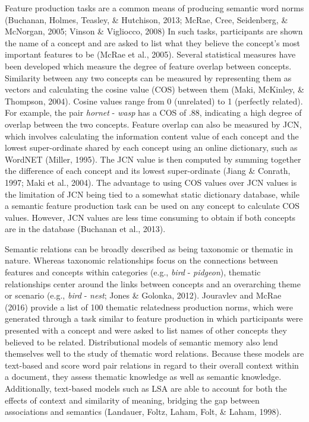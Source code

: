 \documentclass[english,man]{apa6}
\theoremstyle{definition}
\theoremstyle{definition}
\theoremstyle{definition}
\theoremstyle{remark}
\begin{document}
Feature production tasks are a common means of producing semantic word
norms (Buchanan, Holmes, Teasley, \& Hutchison, 2013; McRae, Cree,
Seidenberg, \& McNorgan, 2005; Vinson \& Vigliocco, 2008) In such tasks,
participants are shown the name of a concept and are asked to list what
they believe the concept's most important features to be (McRae et al.,
2005). Several statistical measures have been developed which measure
the degree of feature overlap between concepts. Similarity between any
two concepts can be measured by representing them as vectors and
calculating the cosine value (COS) between them (Maki, McKinley, \&
Thompson, 2004). Cosine values range from 0 (unrelated) to 1 (perfectly
related). For example, the pair \emph{hornet} - \emph{wasp} has a COS of
.88, indicating a high degree of overlap between the two concepts.
Feature overlap can also be measured by JCN, which involves calculating
the information content value of each concept and the lowest
super-ordinate shared by each concept using an online dictionary, such
as WordNET (Miller, 1995). The JCN value is then computed by summing
together the difference of each concept and its lowest super-ordinate
(Jiang \& Conrath, 1997; Maki et al., 2004). The advantage to using COS
values over JCN values is the limitation of JCN being tied to a somewhat
static dictionary database, while a semantic feature production task can
be used on any concept to calculate COS values. However, JCN values are
less time consuming to obtain if both concepts are in the database
(Buchanan et al., 2013).

Semantic relations can be broadly described as being taxonomic or
thematic in nature. Whereas taxonomic relationships focus on the
connections between features and concepts within categories (e.g.,
\emph{bird} - \emph{pidgeon}), thematic relationships center around the
links between concepts and an overarching theme or scenario (e.g.,
\emph{bird} - \emph{nest}; Jones \& Golonka, 2012). Jouravlev and McRae
(2016) provide a list of 100 thematic relatedness production norms,
which were generated through a task similar to feature production in
which participants were presented with a concept and were asked to list
names of other concepts they believed to be related. Distributional
models of semantic memory also lend themselves well to the study of
thematic word relations. Because these models are text-based and score
word pair relations in regard to their overall context within a
document, they assess thematic knowledge as well as semantic knowledge.
Additionally, text-based models such as LSA are able to account for both
the effects of context and similarity of meaning, bridging the gap
between associations and semantics (Landauer, Foltz, Laham, Folt, \&
Laham, 1998).
\end{document}
